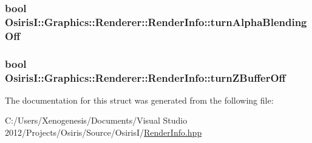 \hypertarget{struct_osiris_i_1_1_graphics_1_1_renderer_1_1_render_info_a38350ac9944d66852a8599ac11e1e20f}{
\subsubsection[{turn\-Alpha\-Blending\-Off}]{\setlength{\rightskip}{0pt plus 5cm}bool Osiris\-I\-::\-Graphics\-::\-Renderer\-::\-Render\-Info\-::turn\-Alpha\-Blending\-Off}}\label{struct_osiris_i_1_1_graphics_1_1_renderer_1_1_render_info_a38350ac9944d66852a8599ac11e1e20f}
\hypertarget{struct_osiris_i_1_1_graphics_1_1_renderer_1_1_render_info_a0ccb6a5b0daa7610dd1848b5e073b871}{
\subsubsection[{turn\-Z\-Buffer\-Off}]{\setlength{\rightskip}{0pt plus 5cm}bool Osiris\-I\-::\-Graphics\-::\-Renderer\-::\-Render\-Info\-::turn\-Z\-Buffer\-Off}}\label{struct_osiris_i_1_1_graphics_1_1_renderer_1_1_render_info_a0ccb6a5b0daa7610dd1848b5e073b871}


The documentation for this struct was generated from the following file\-:\begin{DoxyCompactItemize}
\item 
C\-:/\-Users/\-Xenogenesis/\-Documents/\-Visual Studio 2012/\-Projects/\-Osiris/\-Source/\-Osiris\-I/\hyperlink{_render_info_8hpp}{Render\-Info.\-hpp}\end{DoxyCompactItemize}
